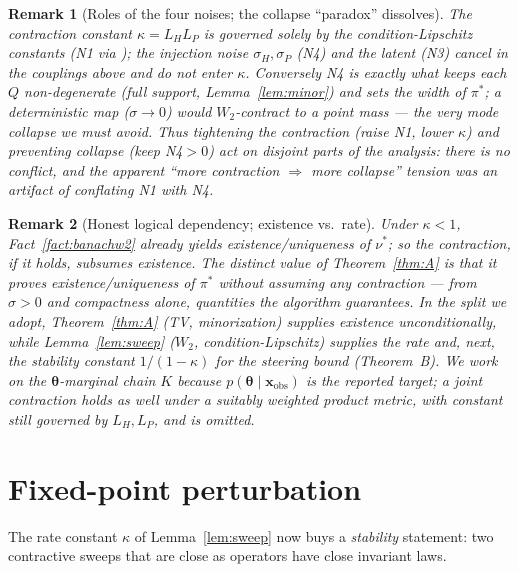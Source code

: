 \documentclass[11pt]{article}
\theoremstyle{definitionbreak}
\theoremstyle{plainbreak}
\theoremstyle{remarkbreak}
\newtheorem{remark}{Remark}[section]
\newcommand{\xobs}{\bm{x}_{\mathrm{obs}}}
\newcommand{\bth}{\bm{\theta}}
\begin{document}
\begin{remark}[Roles of the four noises; the collapse ``paradox'' dissolves]
\label{rem:noises}
The contraction constant $\kappa=L_HL_P$ is governed \emph{solely} by the condition-Lipschitz
constants (N1 via \cite{Bishop}); the injection noise $\sigma_H,\sigma_P$ (N4) and the latent (N3)
\emph{cancel} in the couplings above and do not enter $\kappa$. Conversely N4 is exactly what keeps
each $Q$ non-degenerate (full support, Lemma~\ref{lem:minor}) and sets the width of $\pi^\ast$; a
deterministic map ($\sigma\to0$) would $W_2$-contract to a \emph{point mass} --- the very mode
collapse we must avoid. Thus tightening the contraction (raise N1, lower $\kappa$) and preventing
collapse (keep N4$>0$) act on \emph{disjoint} parts of the analysis: there is no conflict, and the
apparent ``more contraction $\Rightarrow$ more collapse'' tension was an artifact of conflating N1
with N4.
\end{remark}

\begin{remark}[Honest logical dependency; existence vs.\ rate]
\label{rem:depend}
Under $\kappa<1$, Fact~\ref{fact:banachw2} already yields existence/uniqueness of $\nu^\ast$; so the
contraction, \emph{if it holds}, subsumes existence. The distinct value of Theorem~\ref{thm:A} is that
it proves existence/uniqueness of $\pi^\ast$ \emph{without} assuming any contraction --- from
$\sigma>0$ and compactness alone, quantities the algorithm guarantees. In the split we adopt,
Theorem~\ref{thm:A} (TV, minorization) supplies existence unconditionally, while
Lemma~\ref{lem:sweep} ($W_2$, condition-Lipschitz) supplies the \emph{rate} and, next, the stability
constant $1/(1-\kappa)$ for the steering bound (Theorem~B). We work on the $\bth$-marginal chain
$K$ because $p(\bth\mid\xobs)$ is the reported target; a joint contraction holds as well under a
suitably weighted product metric, with constant still governed by $L_H,L_P$, and is omitted.
\end{remark}

\section{Fixed-point perturbation}
\label{sec:perturb}

The rate constant $\kappa$ of Lemma~\ref{lem:sweep} now buys a \emph{stability} statement: two
contractive sweeps that are close as operators have close invariant laws.
\end{document}
